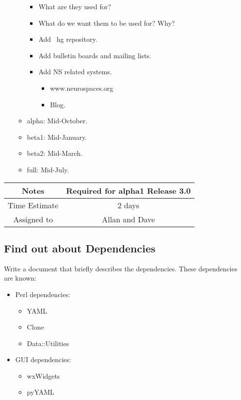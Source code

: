 \documentclass[12pt]{article}
\begin{document}
\begin{itemize}
\begin{itemize}
\begin{itemize}
    \item What are they used for?
    \item What do we want them to be used for? Why?
    \item Add {\ hg} repository.
    \item Add bulletin boards and mailing lists.
    \item Add NS related systems.
      \begin{itemize}
      \item www.neurospaces.org
      \item Blog.
      \end{itemize}
    \end{itemize}
  \item alpha: Mid-October.
  \item beta1: Mid-January.
  \item beta2: Mid-March.
  \item full: Mid-July.
  \end{itemize}
\end{itemize}

{
  \vspace{5mm}
  \centering
  \begin{tabular}{|c|c|}
    \hline
    Notes
    & Required for alpha1 Release 3.0 \\
    \hline
    Time Estimate
    & 2 days \\
    \hline
    Assigned to
    & Allan and Dave \\
    \hline
  \end{tabular}
}


\subsection{Find out about Dependencies}

Write a document that briefly describes the dependencies.  These
dependencies are known:
\begin{itemize}
\item Perl dependencies:
  \begin{itemize}
  \item YAML
  \item Clone
  \item Data::Utilities
  \end{itemize}
\item GUI dependencies:
  \begin{itemize}
  \item wxWidgets
  \item pyYAML
  \end{itemize}
\end{itemize}
\end{document}
